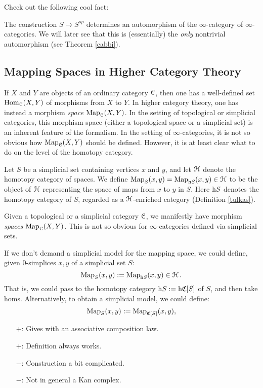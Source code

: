\begin{1.2.1 Opposite of an inf-cat}
\begin{shaded}
Check out the following cool fact:
\end{shaded}

The construction $S \mapsto S^{op}$ determines an automorphism of the $\infty$-category
of $\infty$-categories. We will later see that this is (essentially) the {\em only} nontrivial automorphism
(see Theorem \ref{cabbi}).
\end{1.2.1 Opposite of an inf-cat}
\subsection{Mapping Spaces in Higher Category Theory}\label{prereq1}
\begin{1.2.2 Mapping spaces}

If $X$ and $Y$ are objects of an ordinary category $\operatorname{\mathcal{C}}$, then one has a well-defined
set $\operatorname{Hom}_{\operatorname{\mathcal{C}}}(X,Y)$ of morphisms from $X$ to $Y$. In higher category theory, one has instead a morphism {\em space} $\operatorname{{Map}}_{\operatorname{\mathcal{C}}}(X,Y)$. In the setting of topological or simplicial
categories, this morphism space (either a topological space or a simplicial set) is an inherent feature of the formalism. In the setting of $\infty$-categories, it is not so obvious
how $\operatorname{{Map}}_{\operatorname{\mathcal{C}}}(X,Y)$ should be defined. However, it is at least clear what to do on the level of the homotopy category.

\begin{definition}\label{morspace}
Let $S$ be a simplicial set containing vertices $x$ and $y$, and let
$\operatorname{\mathcal{H}}$ denote the homotopy category of spaces. We define
$\operatorname{{Map}}_{S}(x,y) = \operatorname{{Map}}_{\rm{h} \it{S}}(x,y) \in \operatorname{\mathcal{H}}$ to be the object of $\operatorname{\mathcal{H}}$ representing
the space of maps from $x$ to $y$ in $S$. Here $\rm{h} \it{S}$ denotes the homotopy category of $S$, regarded as a $\operatorname{\mathcal{H}}$-enriched category (Definition \ref{tulkas}). 
\end{definition}
\begin{shaded}
Given a topological or a simplicial category $\operatorname{\mathcal{C}}$, we manifestly have morphism \emph{spaces} $\operatorname{{Map}}_{\operatorname{\mathcal{C}}}(X,Y)$. This is not so obvious for $\infty$-categories defined via simplicial sets.

If we don't demand a simplicial model for the mapping space, we could define, given 0-simplices $x,y$ of a simplicial set $S$:
\[\operatorname{{Map}}_{S}(x,y): = \operatorname{{Map}}_{\rm{h} \it{S}}(x,y) \in \operatorname{\mathcal{H}}.\]
That is, we could pass to the homotopy category $\rm{h} \it{S}:=\rm{h} \it{\operatorname{\mathfrak{C}}}[S]$ of $S$, and then take homs. Alternatively, to obtain a simplicial model, we could define:
\[\operatorname{{Map}}_{S}(x,y): =\operatorname{{Map}}_{\operatorname{\mathfrak{C}}[S]}(x,y),\]
\begin{itemize}\squishlist
\item[$+$:] Gives with an associative composition law.
\item[$+$:] Definition always works.
\item[$-$:] Construction a bit complicated.
\item[$-$:] Not in general a Kan complex.
\end{itemize}
\end{shaded}



\end{1.2.2 Mapping spaces}
